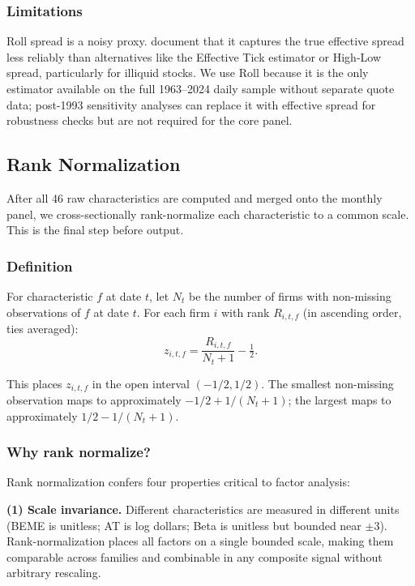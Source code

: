 \subsubsection{Limitations}

Roll spread is a noisy proxy. \cite{Goyenko2009} document that it
captures the true effective spread less reliably than alternatives like
the Effective Tick estimator or High-Low spread, particularly for
illiquid stocks. We use Roll because it is the only estimator available
on the full 1963--2024 daily sample without separate quote data;
post-1993 sensitivity analyses can replace it with effective spread for
robustness checks but are not required for the core panel.

\subsection{Rank Normalization}
\label{subsec:stage0-rank-norm}

After all 46 raw characteristics are computed and merged onto the
monthly panel, we cross-sectionally rank-normalize each characteristic
to a common scale. This is the final step before output.

\subsubsection{Definition}

For characteristic \(f\) at date \(t\), let \(N_t\) be the number of
firms with non-missing observations of \(f\) at date \(t\). For each
firm \(i\) with rank \(R_{i,t,f}\) (in ascending order, ties averaged):
\begin{equation}
z_{i,t,f} = \frac{R_{i,t,f}}{N_t + 1} - \tfrac{1}{2}.
\label{eq:rank-norm}
\end{equation}

This places \(z_{i,t,f}\) in the open interval
\((-1/2, 1/2)\). The smallest non-missing observation maps to
approximately \(-1/2 + 1/(N_t+1)\); the largest maps to approximately
\(1/2 - 1/(N_t+1)\).

\subsubsection{Why rank normalize?}

Rank normalization confers four properties critical to factor analysis:

\textbf{(1) Scale invariance.} Different characteristics are measured
in different units (BEME is unitless; AT is log dollars; Beta is
unitless but bounded near \(\pm 3\)). Rank-normalization places all
factors on a single bounded scale, making them comparable across families
and combinable in any composite signal without arbitrary rescaling.

